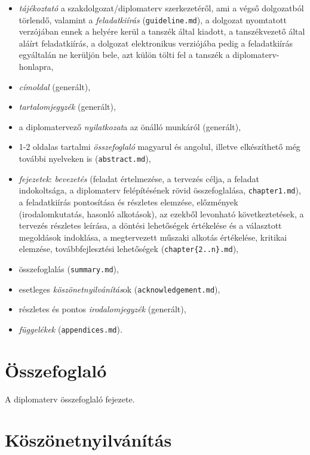 \documentclass[11pt,magyar,a4paper,oneside,]{report}
\begin{document}
\begin{itemize}
\itemsep1pt\parskip0pt
\item
  \emph{tájékoztató} a szakdolgozat/diplomaterv szerkezetéről, ami a
  végső dolgozatból törlendő, valamint a \emph{feladatkiírás}
  (\texttt{guideline.md}), a dolgozat nyomtatott verzójában ennek a
  helyére kerül a tanszék által kiadott, a tanszékvezető által aláírt
  feladatkiírás, a dolgozat elektronikus verziójába pedig a
  feladatkiírás egyáltalán ne kerüljön bele, azt külön tölti fel a
  tanszék a diplomaterv-honlapra,
\item
  \emph{címoldal} (generált),
\item
  \emph{tartalomjegyzék} (generált),
\item
  a diplomatervező \emph{nyilatkozat}a az önálló munkáról (generált),
\item
  1-2 oldalas tartalmi \emph{összefoglaló} magyarul és angolul, illetve
  elkészíthető még további nyelveken is (\texttt{abstract.md}),
\item
  \emph{fejezetek}: \emph{bevezetés} (feladat értelmezése, a tervezés
  célja, a feladat indokoltsága, a diplomaterv felépítésének rövid
  összefoglalása, \texttt{chapter1.md}), a feladatkiírás pontosítása és
  részletes elemzése, előzmények (irodalomkutatás, hasonló alkotások),
  az ezekből levonható következtetések, a tervezés részletes leírása, a
  döntési lehetőségek értékelése és a választott megoldások indoklása, a
  megtervezett műszaki alkotás értékelése, kritikai elemzése,
  továbbfejlesztési lehetőségek (\texttt{chapter\{2..n\}.md}),
\item
  összefoglalás (\texttt{summary.md}),
\item
  esetleges \emph{köszönetnyilvánítás}ok (\texttt{acknowledgement.md}),
\item
  részletes és pontos \emph{irodalomjegyzék} (generált),
\item
  \emph{függelékek} (\texttt{appendices.md}).
\end{itemize}

\chapter{Összefoglaló}\label{uxf6sszefoglaluxf3}

A diplomaterv összefoglaló fejezete.

\chapter*{Köszönetnyilvánítás}\label{kuxf6szuxf6netnyilvuxe1nuxedtuxe1s}
\end{document}
